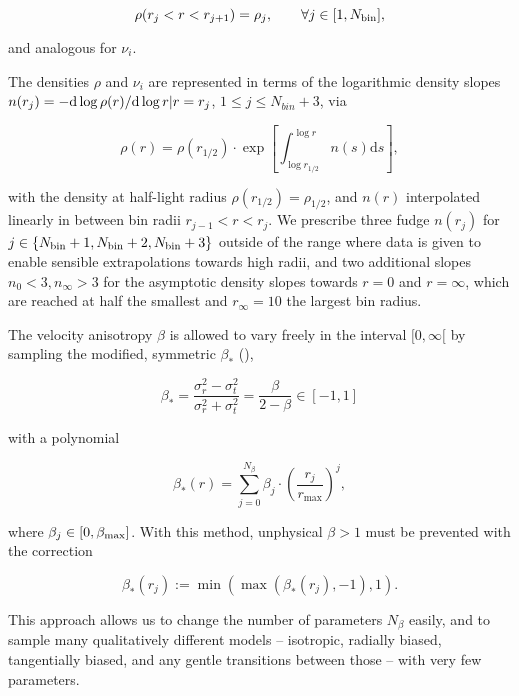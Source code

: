 \begin{equation}\label{eq:binning}
    \rho(r_j < r < r_{j+1}) = \rho_j, \qquad \forall j\in[1, N_{\rm bin}],
\end{equation}

and analogous for $\nu_i$.

The densities $\rho$ and $\nu_i$ are represented in terms of the
logarithmic density slopes $n(r_j)=-{\rm d}\log\rho(r)/{\rm d}\log
r|{r=r_j}$, $1\leq j\leq N_{bin}+3$, via

\begin{equation*}
    \rho(r) = \rho(r_{1/2})\cdot\exp\left[\int_{\log r_{1/2}}^{\log r}n(s)\text{d}s\right],
\end{equation*}

with the density at half-light radius $\rho(r_{1/2})=\rho_{1/2}$, and
$n(r)$ interpolated linearly in between bin radii
$r_{j-1}<r<r_{j}$. We prescribe three fudge $n(r_j)$ for $j\in\{N_{\rm
  bin}+1, N_{\rm bin}+2, N_{\rm bin}+3\}$ outside of the range where
data is given to enable sensible extrapolations towards high radii,
and two additional slopes $n_0 < 3, n_\infty>3$ for the asymptotic
density slopes towards $r=0$ and $r=\infty$, which are reached at half
the smallest and $r_\infty=10$ the largest bin radius.

The velocity anisotropy $\beta$ is allowed to vary freely in the
interval $[0, \infty[$ by sampling the modified, symmetric $\beta_*$
(),

\begin{equation*}
    \beta_* = \frac{\sigma_r^2-\sigma_t^2}{\sigma_r^2+\sigma_t^2} = \frac{\beta}{2-\beta} \in [-1,1]
\end{equation*}

with a polynomial

\begin{equation*}
    \beta_*(r) = \sum_{j=0}^{N_\beta} \beta_j\cdot\left(\frac{r_j}{r_{\text{max}}}\right)^j,
\end{equation*}

where $\beta_j\in [0,\beta_{\rm max}]$. With this method, unphysical
$\beta>1$ must be prevented with the correction

\begin{equation*}
    \beta_*(r_j) := \min(\max(\beta_*(r_j), -1),1).
\end{equation*}

This approach allows us to change the number of parameters $N_\beta$
easily, and to sample many qualitatively different models --
isotropic, radially biased, tangentially biased, and any gentle
transitions between those -- with very few parameters.

